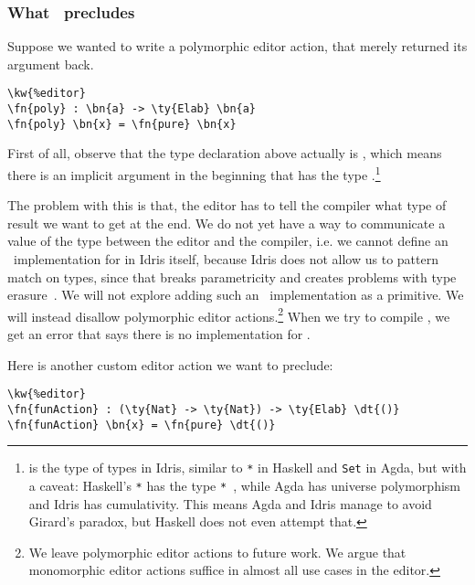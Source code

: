 
\subsubsection{What \Editorable\ precludes}\label{ssec:preclude}

Suppose we wanted to write a polymorphic editor action, that merely returned its argument back.

\begin{Verbatim}
\kw{%editor}
\fn{poly} : \bn{a} -> \ty{Elab} \bn{a}
\fn{poly} \bn{x} = \fn{pure} \bn{x}
\end{Verbatim}

First of all, observe that the type declaration above actually is
, which means
there is an implicit argument in the beginning that has the type
.\footnote{ is the type of types in Idris, similar to
\texttt{*} in Haskell and \texttt{Set} in Agda, but with a caveat:
Haskell's \texttt{*} has the type \texttt{*}~\cite{eisenberg}, while Agda has universe
polymorphism and Idris has cumulativity. This means Agda and Idris manage to
avoid Girard's paradox, but Haskell does not even attempt that.}

The problem with this is that, the editor has to tell the compiler what type of
result we want to get at the end. We do not yet have a way to communicate a
value of the type  between the editor and the compiler, i.e. we cannot
define an \Editorable\ implementation for  in Idris itself, because
Idris does not allow us to pattern match on types, since that breaks
parametricity and creates problems with type erasure~\cite{universePat}.
We will not explore adding such an \Editorable\ implementation as a primitive.
We will instead disallow polymorphic editor actions.\footnote{We leave
polymorphic editor actions to future work. We argue that monomorphic editor
actions suffice in almost all use cases in the editor.}
When we try to compile , we get an error that says there is no  implementation for .

Here is another custom editor action we want to preclude:

\begin{Verbatim}
\kw{%editor}
\fn{funAction} : (\ty{Nat} -> \ty{Nat}) -> \ty{Elab} \dt{()}
\fn{funAction} \bn{x} = \fn{pure} \dt{()}
\end{Verbatim}

